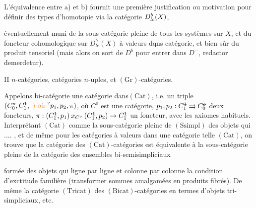 L'équivalence entre a) et b) fournit une première justification ou motivation pour définir des types d'homotopie via la catégorie $D^{b}_{lc}(X)$,


éventuellement muni de la sous-catégorie pleine de tous les systèmes  sur $X$, et du foncteur cohomologique sur $D^b_{lc}(X)$ à valeurs dqns  catégorie, et bien sûr du produit tensoriel (mais alors on sort de $D^b$ pour entrer dans $D^-$, redactor demerdetur).

II \quad $n$-catégories, catégories $n$-uples, et $(\mathrm{Gr})$-catégories.

Appelons bi-catégorie une catégorie dans$(\mathrm{Cat})$, i.e. un triple $(C^{\deleted{o}}_{\handwritten{0}},C^{\deleted{1}}_{\handwritten{1}},\ \deleted{\unsure{)\text{ où }}}p_1,p_2,\handwritten{\pi})$, où $C^o$ est une catégorie, $p_1,p_2:C^{\deleted{1}}_{\handwritten{1}}\handwritten{\rightrightarrows}C^{\deleted{o}}_{\handwritten{0}}$ deux foncteurs, $\handwritten{\pi}:(C^{\deleted{1}}_{\handwritten{1}},p_1)\mathbin{x}_{C^o}(C^{\deleted{1}}_{\handwritten{1}},p_2)\handwritten{\to}C^{\deleted{1}}_{\handwritten{1}}$ un foncteur, avec les axiomes habituels. Interprétant $(\mathrm{Cat})$ comme la sous-catégorie pleine de $(\mathrm{Ssimpl})$ des objets qui .... , et de même pour les catégories à valeurs dans une catégorie telle $(\mathrm{Cat})$, on trouve que la catégorie  des $(\mathrm{Cat})$-catégories est équivalente à la sous-catégorie pleine de la catégorie des ensembles bi-semisimpliciaux


formée des objets qui ligne par ligne et colonne par colonne  la condition d'exctitude familière (transformer sommes amalgamées en produits fibrés). De même la catégorie  $(\mathrm{Tricat})$ des $(\mathrm{Bicat})$-catégories  en termes d'objets tri-simpliciaux, etc.

